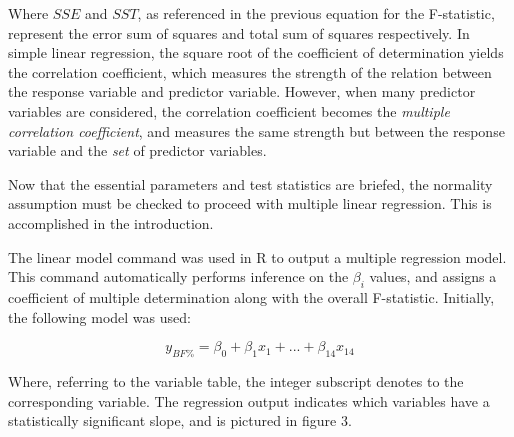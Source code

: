 \documentclass[12pt]{article}
\begin{document}
Where $SSE$ and $SST$, as referenced in the previous equation for the F-statistic, represent the error sum of squares and total sum of squares respectively.  In simple linear regression, the square root of the coefficient of determination yields the correlation coefficient, which measures the strength of the relation between the response variable and predictor variable. However, when many predictor variables are considered, the correlation coefficient becomes the \textit{multiple correlation coefficient}, and measures the same strength but between the response variable and the \textit{set} of predictor variables.

Now that the essential parameters and test statistics are briefed, the normality assumption must be checked to proceed with multiple linear regression. This is accomplished in the introduction.

The linear model command was used in R to output a multiple regression model. This command automatically performs inference on the $\beta_i$ values, and assigns a coefficient of multiple determination along with the overall F-statistic. Initially, the following model was used:

\begin{equation}
    y_{BF\%} = \beta_0 + \beta_1 x_1 + ... + \beta_{14} x_{14}
\end{equation}

Where, referring to the variable table, the integer subscript denotes to the corresponding variable. The regression output indicates which variables have a statistically significant slope, and is pictured in figure 3.
\end{document}

